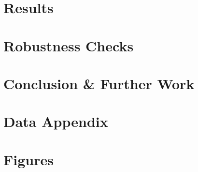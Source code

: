 \documentclass[11pt, oneside]{article}
\begin{document}
\section{Results}


\section{Robustness Checks}


\section{Conclusion \& Further Work}

\newpage




\newpage


\newpage
\section*{Data Appendix}


\newpage
\section*{Figures}


\newpage
\end{document}
